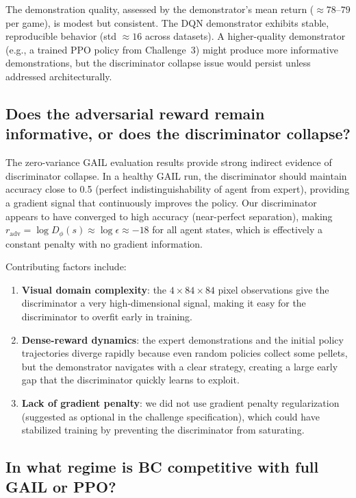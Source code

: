 \documentclass[conference]{IEEEtran}
\begin{document}
The demonstration quality, assessed by the demonstrator's mean return ($\approx78$--$79$
per game), is modest but consistent.
The DQN demonstrator exhibits stable, reproducible behavior (std $\approx16$ across
datasets).
A higher-quality demonstrator (e.g., a trained PPO policy from Challenge~3) might produce
more informative demonstrations, but the discriminator collapse issue would persist unless
addressed architecturally.

\subsection{Does the adversarial reward remain informative, or does the discriminator collapse?}

The zero-variance GAIL evaluation results provide strong indirect evidence of discriminator
collapse.
In a healthy GAIL run, the discriminator should maintain accuracy close to 0.5
(perfect indistinguishability of agent from expert), providing a gradient signal that
continuously improves the policy.
Our discriminator appears to have converged to high accuracy (near-perfect separation),
making $r_{\text{adv}} = \log D_\phi(s) \approx \log\epsilon \approx -18$ for all agent
states, which is effectively a constant penalty with no gradient information.

Contributing factors include:
\begin{enumerate}
  \item \textbf{Visual domain complexity}: the $4\times84\times84$ pixel observations
        give the discriminator a very high-dimensional signal, making it easy for the
        discriminator to overfit early in training.
  \item \textbf{Dense-reward dynamics}: the expert demonstrations and the initial policy
        trajectories diverge rapidly because even random policies collect some pellets,
        but the demonstrator navigates with a clear strategy, creating a large early gap
        that the discriminator quickly learns to exploit.
  \item \textbf{Lack of gradient penalty}: we did not use gradient penalty regularization
        (suggested as optional in the challenge specification), which could have stabilized
        training by preventing the discriminator from saturating.
\end{enumerate}

\subsection{In what regime is BC competitive with full GAIL or PPO?}
\end{document}
